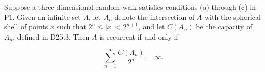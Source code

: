 Suppose a three-dimensional random walk satisfies conditions (a) through (c) in P1. Given an infinite set $A$, let $A_n$ denote the intersection of $A$ with the spherical shell of points $x$ such that $2^n \leq |x| < 2^{n+1}$, and let $C(A_n)$ be the capacity of $A_n$, defined in D25.3. Then $A$ is recurrent if and only if

$$\sum_{n=1}^{\infty} \frac{C(A_n)}{2^n} = \infty.$$